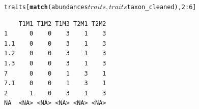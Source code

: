 \documentclass[letterpaper,superscriptaddress,showkeys,longbibliography,10pt]{revtex4-1}\usepackage{graphicx, color}
\makeatletter
\newcommand{\hlfunctioncall}[1]{\textcolor[rgb]{0.501960784313725,0,0.329411764705882}{\textbf{#1}}}%
\newenvironment{kframe}{%
 \def\at@end@of@kframe{}%
 \ifinner\ifhmode%
  \def\at@end@of@kframe{\end{minipage}}%
  \begin{minipage}{\columnwidth}%
 \fi\fi%
 \def\FrameCommand##1{\hskip\@totalleftmargin \hskip-\fboxsep
 \colorbox{shadecolor}{##1}\hskip-\fboxsep
     \hskip-\linewidth \hskip-\@totalleftmargin \hskip\columnwidth}%
 \MakeFramed {\advance\hsize-\width
   \@totalleftmargin\z@ \linewidth\hsize
   \@setminipage}}%
 {\par\unskip\endMakeFramed%
 \at@end@of@kframe}
\newenvironment{knitrout}{}{} %
\makeatother
\begin{document}
\begin{appendices}
\begin{knitrout}
\begin{kframe}
\begin{alltt}
traits[\hlfunctioncall{match}(abundances$traits, traits$taxon_cleaned), 2:6]
\end{alltt}
\begin{verbatim}
    T1M1 T1M2 T1M3 T2M1 T2M2
1      0    0    3    1    3
1.1    0    0    3    1    3
1.2    0    0    3    1    3
1.3    0    0    3    1    3
7      0    0    1    3    1
7.1    0    0    1    3    1
2      1    0    3    1    3
NA  <NA> <NA> <NA> <NA> <NA>
\end{verbatim}
\end{kframe}
\end{knitrout}



\end{appendices}



\end{document}
